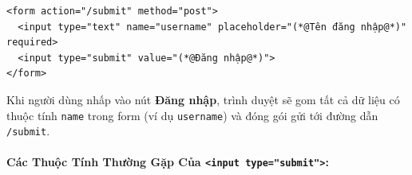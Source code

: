 \documentclass[11pt,oneside]{book}
\newcommand{\codeinline}[1]{\textcolor{accentOrange}{\texttt{#1}}}
\begin{document}
\begin{codeWindow}[Cú pháp cơ bản của nút input type="submit"]
\begin{lstlisting}[language=HTML5]
<form action="/submit" method="post">
  <input type="text" name="username" placeholder="(*@Tên đăng nhập@*)" required>
  <input type="submit" value="(*@Đăng nhập@*)">
</form>
\end{lstlisting}
\end{codeWindow}

\begin{browserWindow}
\sffamily\small
{} \quad
{}
\end{browserWindow}

\begin{tipBox}
Khi người dùng nhấp vào nút \textbf{Đăng nhập}, trình duyệt sẽ gom tất cả dữ liệu có thuộc tính \codeinline{name} trong form (ví dụ \codeinline{username}) và đóng gói gửi tới đường dẫn \codeinline{/submit}.
\end{tipBox}

\paragraph{Các Thuộc Tính Thường Gặp Của \codeinline{<input type="submit">}:}
\end{document}
